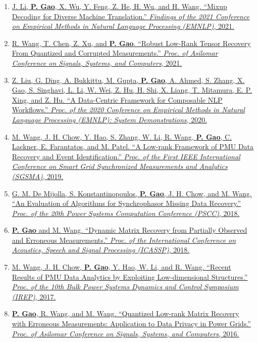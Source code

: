 \documentclass[10pt]{article}
\makeatletter
\newlength{\bibhang}
\newlength{\bibsep}
 {\@listi \global\bibsep\itemsep \global\advance\bibsep by\parsep}
\newenvironment{bibsection}%
        {\begin{enumerate}{}{%
       \setlength{\leftmargin}{\bibhang}%
       \setlength{\itemindent}{-\leftmargin}%
       \setlength{\itemsep}{\bibsep}%
       \setlength{\parsep}{\z@}%
        \setlength{\partopsep}{0pt}%
        \setlength{\topsep}{0pt}}}
        {\end{enumerate}\vspace{-.6\baselineskip}}
\makeatother
\begin{document}
\begin{bibsection}
\item \href{}{J. Li, {\bf P. Gao}, X. Wu, Y. Feng, Z. He, H. Wu, and H. Wang. ``Mixup Decoding for Diverse Machine Translation.'' \emph{Findings of the 2021 Conference on Empirical Methods in Natural Language Processing (EMNLP)}, 2021.}

\item \href{}{R. Wang, T. Chen, Z. Xu, and {\bf P. Gao}. ``Robust Low-Rank Tensor Recovery From Quantized and Corrupted Measurements.'' \emph{Proc. of Asilomar Conference on Signals, Systems, and Computers}, 2021.}
	
\item \href{}{Z. Liu, G. Ding, A. Bukkittu, M. Gupta, {\bf P. Gao}, A. Ahmed, S. Zhang, X. Gao, S. Singhavi, L. Li, W. Wei, Z. Hu, H. Shi, X. Liang, T. Mitamura, E. P. Xing, and Z. Hu. ``A Data-Centric Framework for Composable NLP Workflows.'' \emph{Proc. of the 2020 Conference on Empirical Methods in Natural Language Processing (EMNLP): System Demonstrations}, 2020.}
	
\item \href{}{M. Wang, J. H. Chow, Y. Hao, S. Zhang, W. Li, R. Wang, {\bf P. Gao}, C. Lackner, E. Farantatos, and M. Patel. ``A Low-rank Framework of PMU Data Recovery and Event Identification.'' \emph{Proc. of the First IEEE International Conference on Smart Grid Synchronized Measurements and Analytics (SGSMA)}, 2019.}

\item \href{}{G. M. De Mijolla, S. Konstantinopoulos, {\bf P. Gao}, J. H. Chow, and M. Wang. ``An Evaluation of Algorithms for Synchrophasor Missing Data Recovery.'' \emph{Proc. of the 20th Power Systems Computation Conference (PSCC)}, 2018.}

\item \href{}{{\bf P. Gao} and M. Wang. ``Dynamic Matrix Recovery from Partially Observed and Erroneous Measurements.'' \emph{Proc. of the International Conference on Acoustics, Speech and Signal Processing (ICASSP)}, 2018.}
	
\item \href{}{M. Wang, J. H. Chow, {\bf P. Gao}, Y. Hao, W. Li, and R. Wang. ``Recent Results of PMU Data Analytics by Exploiting Low-dimensional Structures.'' \emph{Proc. of the 10th Bulk Power Systems Dynamics and Control Symposium (IREP)}, 2017.}
	
\item \href{}{{\bf P. Gao}, R. Wang, and M. Wang. ``Quantized Low-rank Matrix Recovery with Erroneous Measurements: Application to Data Privacy in Power Grids.'' \emph{Proc. of Asilomar Conference on Signals, Systems, and Computers}, 2016.}
	

\end{bibsection}
\end{document}
